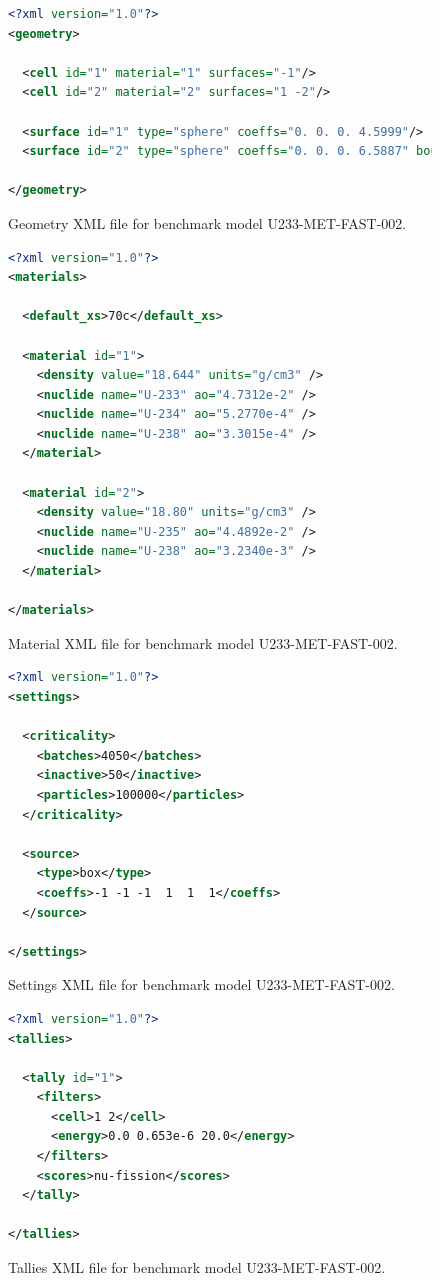 \documentclass[authoryear,preprint]{elsarticle}
\begin{document}
\begin{figure}
  \begin{lstlisting}[language=xml]
<?xml version="1.0"?>
<geometry>

  <cell id="1" material="1" surfaces="-1"/>
  <cell id="2" material="2" surfaces="1 -2"/>

  <surface id="1" type="sphere" coeffs="0. 0. 0. 4.5999"/>
  <surface id="2" type="sphere" coeffs="0. 0. 0. 6.5887" boundary="vacuum"/>

</geometry>
  \end{lstlisting}
  \caption{Geometry XML file for benchmark model U233-MET-FAST-002.}
  \label{fig:geometry-xml}
\end{figure}

\begin{figure}
  \begin{lstlisting}[language=xml]
<?xml version="1.0"?>
<materials>

  <default_xs>70c</default_xs>

  <material id="1">
    <density value="18.644" units="g/cm3" />
    <nuclide name="U-233" ao="4.7312e-2" />
    <nuclide name="U-234" ao="5.2770e-4" />
    <nuclide name="U-238" ao="3.3015e-4" />
  </material>

  <material id="2">
    <density value="18.80" units="g/cm3" />
    <nuclide name="U-235" ao="4.4892e-2" />
    <nuclide name="U-238" ao="3.2340e-3" />
  </material>

</materials>
  \end{lstlisting}
  \caption{Material XML file for benchmark model U233-MET-FAST-002.}
  \label{fig:materials-xml}
\end{figure}

\begin{figure}
  \begin{lstlisting}[language=XML]
<?xml version="1.0"?>
<settings>
 
  <criticality>
    <batches>4050</batches>
    <inactive>50</inactive>
    <particles>100000</particles>
  </criticality>

  <source>
    <type>box</type>
    <coeffs>-1 -1 -1  1  1  1</coeffs>
  </source>

</settings>
  \end{lstlisting}
  \caption{Settings XML file for benchmark model U233-MET-FAST-002.}
  \label{fig:settings-xml}
\end{figure}

\begin{figure}
  \begin{lstlisting}[language=XML]
<?xml version="1.0"?>
<tallies>

  <tally id="1">
    <filters>
      <cell>1 2</cell>
      <energy>0.0 0.653e-6 20.0</energy>
    </filters>
    <scores>nu-fission</scores>
  </tally>

</tallies>
  \end{lstlisting}
  \caption{Tallies XML file for benchmark model U233-MET-FAST-002.}
  \label{fig:tallies-xml}
\end{figure}
\end{document}
